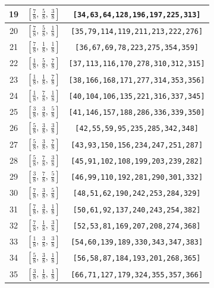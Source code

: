 \documentclass[fleqn,8pt]{jsarticle}
\begin{document}
\begin{longtable}{ccc}
19 & $\left[ \frac{7}{8},\, \frac{5}{8},\, \frac{3}{8} \right]$ & {\tt [34,63,64,128,196,197,225,313]} \\ \hline
20 & $\left[ \frac{7}{8},\, \frac{5}{8},\, \frac{1}{8} \right]$ & {\tt [35,79,114,119,211,213,222,276]} \\ \hline
21 & $\left[ \frac{7}{8},\, \frac{1}{8},\, \frac{1}{8} \right]$ & {\tt [36,67,69,78,223,275,354,359]} \\ \hline
22 & $\left[ \frac{1}{8},\, \frac{5}{8},\, \frac{7}{8} \right]$ & {\tt [37,113,116,170,278,310,312,315]} \\ \hline
23 & $\left[ \frac{1}{8},\, \frac{1}{8},\, \frac{7}{8} \right]$ & {\tt [38,166,168,171,277,314,353,356]} \\ \hline
24 & $\left[ \frac{1}{8},\, \frac{7}{8},\, \frac{1}{8} \right]$ & {\tt [40,104,106,135,221,316,337,345]} \\ \hline
25 & $\left[ \frac{3}{8},\, \frac{3}{8},\, \frac{5}{8} \right]$ & {\tt [41,146,157,188,286,336,339,350]} \\ \hline
26 & $\left[ \frac{5}{8},\, \frac{3}{8},\, \frac{3}{8} \right]$ & {\tt [42,55,59,95,235,285,342,348]} \\ \hline
27 & $\left[ \frac{5}{8},\, \frac{3}{8},\, \frac{7}{8} \right]$ & {\tt [43,93,150,156,234,247,251,287]} \\ \hline
28 & $\left[ \frac{5}{8},\, \frac{7}{8},\, \frac{3}{8} \right]$ & {\tt [45,91,102,108,199,203,239,282]} \\ \hline
29 & $\left[ \frac{3}{8},\, \frac{7}{8},\, \frac{5}{8} \right]$ & {\tt [46,99,110,192,281,290,301,332]} \\ \hline
30 & $\left[ \frac{7}{8},\, \frac{3}{8},\, \frac{5}{8} \right]$ & {\tt [48,51,62,190,242,253,284,329]} \\ \hline
31 & $\left[ \frac{7}{8},\, \frac{3}{8},\, \frac{1}{8} \right]$ & {\tt [50,61,92,137,240,243,254,382]} \\ \hline
32 & $\left[ \frac{7}{8},\, \frac{1}{8},\, \frac{3}{8} \right]$ & {\tt [52,53,81,169,207,208,274,368]} \\ \hline
33 & $\left[ \frac{1}{8},\, \frac{3}{8},\, \frac{3}{8} \right]$ & {\tt [54,60,139,189,330,343,347,383]} \\ \hline
34 & $\left[ \frac{5}{8},\, \frac{3}{8},\, \frac{1}{8} \right]$ & {\tt [56,58,87,184,193,201,268,365]} \\ \hline
35 & $\left[ \frac{3}{8},\, \frac{1}{8},\, \frac{1}{8} \right]$ & {\tt [66,71,127,179,324,355,357,366]} \\ \hline

\end{longtable}
\end{document}
